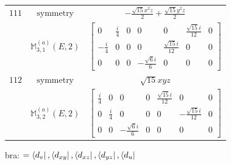 \documentclass[fleqn,8pt,landscape]{jsarticle}
\begin{document}
\begin{longtable}{ccc}
$ 111 $ & $ \text{symmetry} $ & $ - \frac{\sqrt{15} x^{2} z}{2} + \frac{\sqrt{15} y^{2} z}{2} $ \\
$  $ & $ \mathbb{M}_{3,1}^{(a)}(E,2) $ & $ \begin{bmatrix} 0 & \frac{i}{4} & 0 & 0 & 0 & \frac{\sqrt{15} i}{12} & 0 \\ - \frac{i}{4} & 0 & 0 & 0 & \frac{\sqrt{15} i}{12} & 0 & 0 \\ 0 & 0 & 0 & - \frac{\sqrt{6} i}{6} & 0 & 0 & 0 \end{bmatrix} $ \\ \hline
$ 112 $ & $ \text{symmetry} $ & $ \sqrt{15} x y z $ \\
$  $ & $ \mathbb{M}_{3,2}^{(a)}(E,2) $ & $ \begin{bmatrix} \frac{i}{4} & 0 & 0 & 0 & \frac{\sqrt{15} i}{12} & 0 & 0 \\ 0 & \frac{i}{4} & 0 & 0 & 0 & - \frac{\sqrt{15} i}{12} & 0 \\ 0 & 0 & - \frac{\sqrt{6} i}{6} & 0 & 0 & 0 & 0 \end{bmatrix} $ \\ \hline
\end{longtable}
bra: $=\bra{d_{v}}, \bra{d_{xy}}, \bra{d_{xz}}, \bra{d_{yz}}, \bra{d_{u}}$
\end{document}
